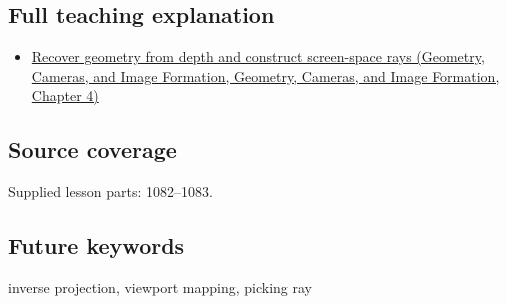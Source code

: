\subsection{Full teaching explanation}\label{appendix-f1a6d43e80d1-full-teaching-explanation}

\begin{itemize}
\tightlist
\item
  \href{../03-Geometry-Cameras-and-Image-Formation/main.pdf\#nameddest=02-foundations-ii-ch035-recover-geometry-from-depth-and-construct-screen-space-rays}{Recover geometry from depth and construct screen-space rays (Geometry, Cameras, and Image Formation, Geometry, Cameras, and Image Formation, Chapter 4)}
\end{itemize}

\subsection{Source coverage}\label{appendix-f1a6d43e80d1-source-coverage}

Supplied lesson parts: 1082--1083.

\subsection{Future keywords}\label{appendix-f1a6d43e80d1-future-keywords}

inverse projection, viewport mapping, picking ray
